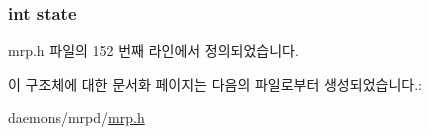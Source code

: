 \subsubsection[{\texorpdfstring{state}{state}}]{\setlength{\rightskip}{0pt plus 5cm}int state}\hypertarget{structmrp__periodictimer__state_a89f234133d3efe315836311cbf21c64b}{}\label{structmrp__periodictimer__state_a89f234133d3efe315836311cbf21c64b}


mrp.\+h 파일의 152 번째 라인에서 정의되었습니다.



이 구조체에 대한 문서화 페이지는 다음의 파일로부터 생성되었습니다.\+:\begin{DoxyCompactItemize}
\item 
daemons/mrpd/\hyperlink{mrp_8h}{mrp.\+h}\end{DoxyCompactItemize}

